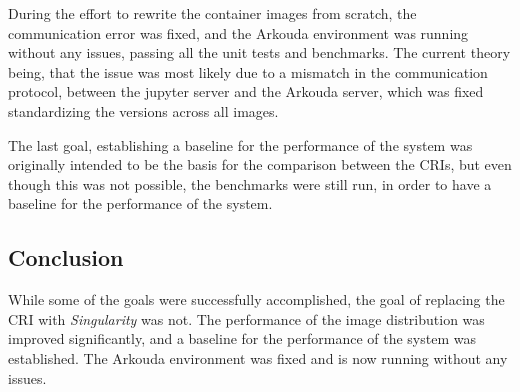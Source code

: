 During the effort to rewrite the container images from scratch, the communication error was fixed,
and the Arkouda environment was running without any issues, passing all the unit tests and benchmarks.
The current theory being, that the issue was most likely due to a mismatch in the communication protocol,
between the jupyter server and the Arkouda server, which was fixed standardizing the versions across all images.

The last goal, establishing a baseline for the performance of the system was originally intended to be the basis
for the comparison between the \ac{CRI}s, but even though this was not possible, the benchmarks were still run,
in order to have a baseline for the performance of the system.

\subsection{Conclusion}

While some of the goals were successfully accomplished,
the goal of replacing the \ac{CRI} with \textit{Singularity} was not.
The performance of the image distribution was improved significantly,
and a baseline for the performance of the system was established.
The Arkouda environment was fixed and is now running without any issues.


\pagebreak